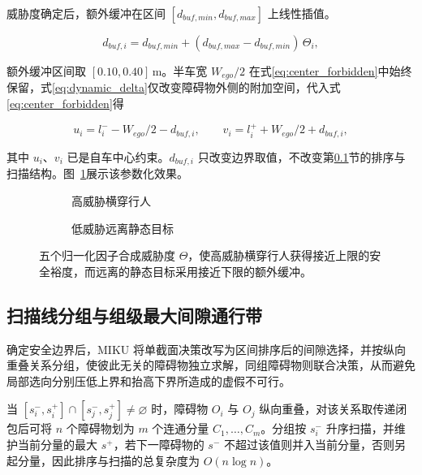 \documentclass[a4paper,zihao=5]{ctexart}
\theoremstyle{definition}
\begin{document}
威胁度确定后，额外缓冲在区间 $[d_{buf,min},d_{buf,max}]$ 上线性插值。

\begin{equation}
    d_{buf,i} = d_{buf,min} + (d_{buf,max} - d_{buf,min})\,\Theta_i,
    \label{eq:dynamic_delta}
\end{equation}

额外缓冲区间取 $[0.10,0.40]$\,m。半车宽 $W_{ego}/2$ 在式\eqref{eq:center_forbidden}中始终保留，式\eqref{eq:dynamic_delta}仅改变障碍物外侧的附加空间，代入式\eqref{eq:center_forbidden}得

\begin{equation}
    u_i=l_i^{-}-W_{ego}/2-d_{buf,i},\qquad
    v_i=l_i^{+}+W_{ego}/2+d_{buf,i},
    \label{eq:dynamic_uv}
\end{equation}

其中 $u_i$、$v_i$ 已是自车中心约束。$d_{buf,i}$ 只改变边界取值，不改变第\ref{sec:method_band}节的排序与扫描结构。图~\ref{fig:threat_radar}展示该参数化效果。

\begin{figure}[htbp]
\centering
\begin{subfigure}[b]{0.42\textwidth}
  \centering
  \caption{高威胁横穿行人}
\end{subfigure}\hfill
\begin{subfigure}[b]{0.42\textwidth}
  \centering
  \caption{低威胁远离静态目标}
\end{subfigure}
\caption{多因子威胁度画像与差异化安全裕度}
\caption*{五个归一化因子合成威胁度 $\Theta$，使高威胁横穿行人获得接近上限的安全裕度，而远离的静态目标采用接近下限的额外缓冲。}
\label{fig:threat_radar}
\end{figure}

\subsection{扫描线分组与组级最大间隙通行带}
\label{sec:method_band}

确定安全边界后，MIKU 将单截面决策改写为区间排序后的间隙选择，并按纵向重叠关系分组，使彼此无关的障碍物独立求解，同组障碍物则联合决策，从而避免局部选向分别压低上界和抬高下界所造成的虚假不可行。

当 $[s_i^{-},s_i^{+}]\cap[s_j^{-},s_j^{+}]\neq\varnothing$ 时，障碍物 $O_i$ 与 $O_j$ 纵向重叠，对该关系取传递闭包后可将 $n$ 个障碍物划为 $m$ 个连通分量 $C_1,\ldots,C_m$。分组按 $s_i^{-}$ 升序扫描，并维护当前分量的最大 $s^{+}$，若下一障碍物的 $s^{-}$ 不超过该值则并入当前分量，否则另起分量，因此排序与扫描的总复杂度为 $O(n\log n)$。
\end{document}
